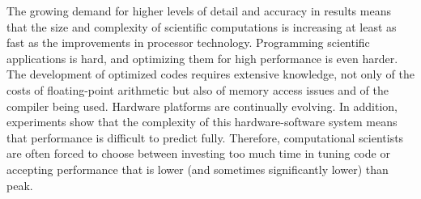 \documentclass[11pt]{article}
\begin{document}

The growing demand for higher levels of detail and accuracy in results means that the size and complexity of scientific computations is increasing at least as fast as the improvements in processor technology. Programming scientific applications is hard, and optimizing them for high performance is even harder.  The development of optimized codes requires extensive knowledge, not only of the costs of floating-point arithmetic but also of  memory access issues and of the compiler being used. Hardware platforms are continually evolving. In addition, experiments show that the complexity of this  hardware-software system means that performance is difficult to predict fully.  Therefore, computational scientists are often forced to choose between investing too much time in tuning code or  accepting performance that is lower (and sometimes significantly lower) than peak.
\end{document}
